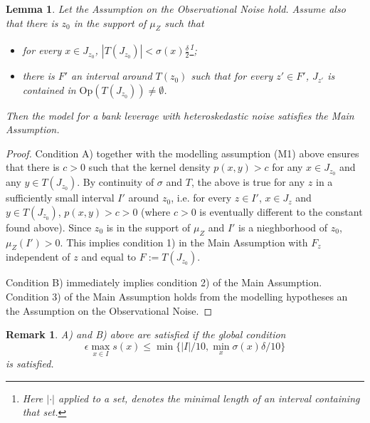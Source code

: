 \documentclass{article}
\newcommand{\1}{\mathbbm{1}}
\newtheorem{remark}[theorem]{Remark}
\newtheorem{lemma}[theorem]{Lemma}
\begin{document}
\begin{lemma}
Let the Assumption on the Observational Noise hold. Assume also that there is $z_0$ in the support of $\mu_Z$  such that 
\begin{itemize}
\item[A)]  for every $x\in J_{z_0}$, $|T(J_{z_0})|<\sigma(x) \frac{\delta}{2}$\footnote{Here $|\cdot|$ applied to a set, denotes the minimal length of an interval containing that set.};
\item[B)]  there is $F'$ an interval around $T(z_0)$ such that for every $z'\in F'$, $J_{z'}$ is contained in $\mbox{Op}(T(J_{z_0}))\neq \emptyset$.
\end{itemize}

Then the model for a bank leverage with heteroskedastic noise satisfies the Main Assumption.
\end{lemma}
\begin{proof}
Condition A) together with the modelling assumption (M1) above ensures that there is $c>0$ such that the kernel density $p(x,y)>c$ for any $x\in J_{z_0}$ and any $y\in T(J_{z_0})$. By continuity of $\sigma$ and $T$, the above is true for any $z$ in a sufficiently small interval $I'$ around $z_0$, i.e. for every $z\in I'$, $x\in J_z$ and $y\in T(J_{z_0})$, $p(x,y)>c>0$ (where $c>0$ is eventually different to the constant found above). Since $z_0$ is in the support of $\mu_Z$ and $I'$ is a nieghborhood of $z_0$, $\mu_Z(I')>0$.  This implies condition 1) in the Main Assumption with $F_z$ independent of $z$ and equal to $F:=T(J_{z_0})$.

Condition B) immediately implies condition 2) of the Main Assumption. Condition 3) of the Main Assumption holds from the modelling hypotheses an the Assumption on the Observational Noise.
\end{proof}

\begin{remark}
A) and B) above are satisfied if the global condition
\[
\epsilon \max_{x\in I} s(x)\le \min\{|I|/10,\min_x\sigma(x)\delta/10\}
\] 
is satisfied.
\end{remark}

\end{document}
